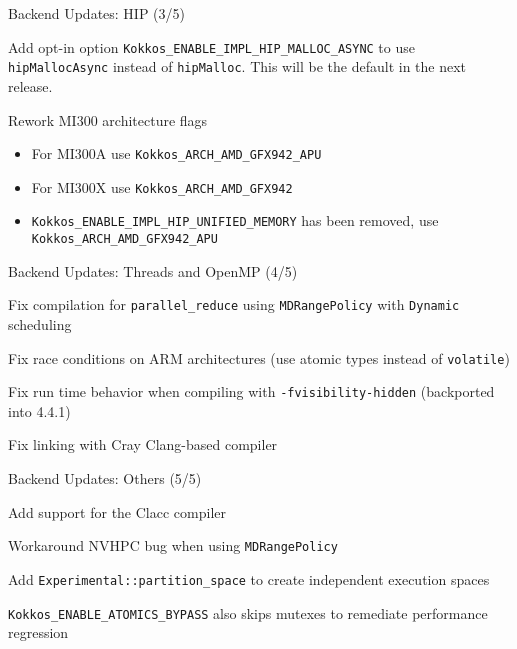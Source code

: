 \begin{frame}[fragile]{Backend Updates: HIP (3/5)}
  \begin{description}[HIP]
    \item[HIP] Add opt-in option \texttt{Kokkos\_ENABLE\_IMPL\_HIP\_MALLOC\_ASYNC} to
      use \texttt{hipMallocAsync} instead of \texttt{hipMalloc}. This will be
      the default in the next release.
    \item[HIP] Rework MI300 architecture flags
      \begin{itemize}
        \item For MI300A use \texttt{Kokkos\_ARCH\_AMD\_GFX942\_APU}
        \item For MI300X use \texttt{Kokkos\_ARCH\_AMD\_GFX942}
        \item \texttt{Kokkos\_ENABLE\_IMPL\_HIP\_UNIFIED\_MEMORY} has been
          removed, use \texttt{Kokkos\_ARCH\_AMD\_GFX942\_APU}
      \end{itemize}
  \end{description}
\end{frame}

\begin{frame}[fragile]{Backend Updates: Threads and OpenMP (4/5)}
   \begin{description}[OpenMP]
     \item[Threads] Fix compilation for \texttt{parallel\_reduce} using
       \texttt{MDRangePolicy} with \texttt{Dynamic} scheduling
     \item[Threads] Fix race conditions on ARM architectures (use atomic types instead of \texttt{volatile})
     \item[OpenMP] Fix run time behavior when compiling with
       \texttt{-fvisibility-hidden} (backported into 4.4.1)
     \item[OpenMP] Fix linking with Cray Clang-based compiler
   \end{description}
\end{frame}


\begin{frame}[fragile]{Backend Updates: Others (5/5)}
   \begin{description}[OpenACC]
     \item[OpenACC] Add support for the Clacc compiler
     \item[OpenACC] Workaround NVHPC bug when using \texttt{MDRangePolicy}
     \item[HPX] Add \texttt{Experimental::partition\_space} to create
       independent execution spaces
     \item[Serial] \texttt{Kokkos\_ENABLE\_ATOMICS\_BYPASS} also skips mutexes to remediate performance
       regression 
   \end{description}
\end{frame}

